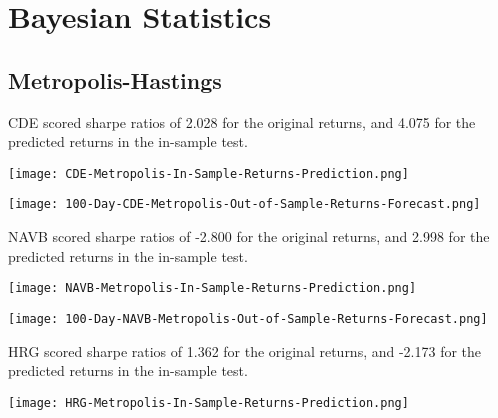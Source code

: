 \section{Bayesian Statistics}

\subsection{Metropolis-Hastings}

CDE scored sharpe ratios of 2.028 for the original returns, and 4.075 for the predicted returns in the in-sample test.

\begin{center}
    \texttt{[image: CDE-Metropolis-In-Sample-Returns-Prediction.png]}
    \label{fig:nonfloat}
\end{center}

\begin{center}  
    \texttt{[image: 100-Day-CDE-Metropolis-Out-of-Sample-Returns-Forecast.png]}
    \label{fig:nonfloat}
\end{center}

NAVB scored sharpe ratios of -2.800 for the original returns, and 2.998 for the predicted returns in the in-sample test.

\begin{center}
    \texttt{[image: NAVB-Metropolis-In-Sample-Returns-Prediction.png]}
    \label{fig:nonfloat}
\end{center}

\begin{center}  
    \texttt{[image: 100-Day-NAVB-Metropolis-Out-of-Sample-Returns-Forecast.png]}
    \label{fig:nonfloat}
\end{center}

HRG scored sharpe ratios of 1.362 for the original returns, and -2.173 for the predicted returns in the in-sample test.

\begin{center}
    \texttt{[image: HRG-Metropolis-In-Sample-Returns-Prediction.png]}
    \label{fig:nonfloat}
\end{center}

